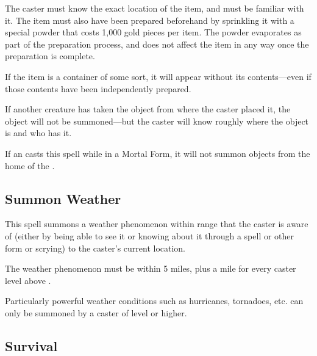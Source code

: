 \begin{multicols*}{2}
The caster must know the exact location of the item, and must be familiar with it. The item must also have been prepared beforehand by sprinkling it with a special powder that costs 1,000 gold pieces per item. The powder evaporates as part of the preparation process, and does not affect the item in any way once the preparation is complete.

If the item is a container of some sort, it will appear without its contents—even if those contents have been independently prepared.

If another creature has taken the object from where the caster placed it, the object will not be summoned—but the caster will know roughly where the object is and who has it.

If an  casts this spell while in a Mortal Form, it will not summon objects from the home of the  .

\subsection{Summon Weather}\label{spell:Summon Weather}

This spell summons a weather phenomenon within range that the caster is aware of (either by being able to see it or knowing about it through a  spell or other form or scrying) to the caster’s current location.

The weather phenomenon must be within 5 miles, plus a mile for every caster level above .

Particularly powerful weather conditions such as hurricanes, tornadoes, etc. can only be summoned by a caster of  level or higher.

\subsection{Survival}\label{spell:Survival}
\end{multicols*}
